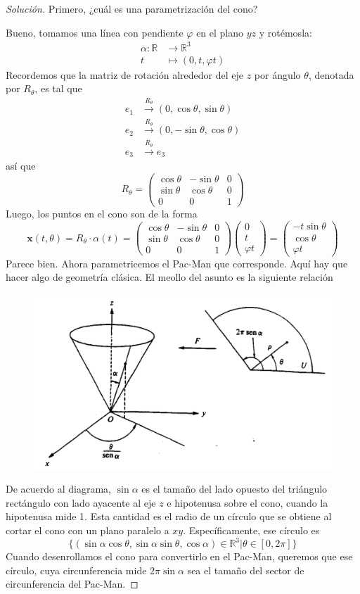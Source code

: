 \documentclass[spanish]{book}
\theoremstyle{definition}
\newcommand{\R}{\mathbb{R}}
\begin{document}
\begin{proof}[Solución]
	Primero, ¿cuál es una parametrización del cono?
	
	Bueno, tomamos una línea con pendiente $\varphi$ en el plano $yz$ y rotémosla:
	\begin{align*}
		\alpha:\R&\to\R^3\\
		t&\mapsto(0,t,\varphi t)
	\end{align*}
	Recordemos que la matriz de rotación alrededor del eje $z$ por ángulo $\theta$, denotada por $R_\theta$, es tal que
	\begin{align*}
		e_1&\xrightarrow{R_\theta} (0,\cos\theta,\sin\theta)\\
		e_2&\xrightarrow{R_\theta}(0,-\sin\theta,\cos\theta)\\
		e_3&\xrightarrow{R_\theta}e_3
	\end{align*}
	así que
	\[R_\theta=\begin{pmatrix}\cos\theta&-\sin\theta&0\\ \sin\theta&\cos\theta&0\\0&0&1\end{pmatrix}\]
	Luego, los puntos en el cono son de la forma
	\[\mathbf{x}(t,\theta)=R_\theta\cdot\alpha(t)=\begin{pmatrix}\cos\theta&-\sin\theta&0\\ \sin\theta&\cos\theta&0\\0&0&1\end{pmatrix}\begin{pmatrix}0\\t\\\varphi t\end{pmatrix}=\begin{pmatrix}-t\sin\theta\\\cos\theta\\\varphi t\end{pmatrix}\]
	Parece bien. Ahora parametricemos el Pac-Man que corresponde. Aquí hay que hacer algo de geometría clásica. El meollo del asunto es la siguiente relación
	\begin{figure}[H]
		\centering
		\includegraphics[width=0.5\linewidth]{sup21}
	\end{figure}
	De acuerdo al diagrama, $\sin\alpha$ es el tamaño del lado opuesto del triángulo rectángulo con lado ayacente al eje $z$ e hipotenusa sobre el cono, cuando la hipotenusa mide 1. Esta cantidad es el radio de un círculo que se obtiene al cortar el cono con un plano paralelo a $xy$. Específicamente, ese círculo es
	\[\{(\sin\alpha\cos\theta,\sin\alpha\sin{{\theta}},\cos\alpha)\in\R^3|\theta\in[0,2\pi]\}\]
	Cuando desenrollamos el cono para convertirlo en el Pac-Man, queremos que ese círculo, cuya circunferencia mide $2\pi\sin\alpha$ sea el tamaño del sector de circunferencia del Pac-Man.
	

\end{proof}
\end{document}
